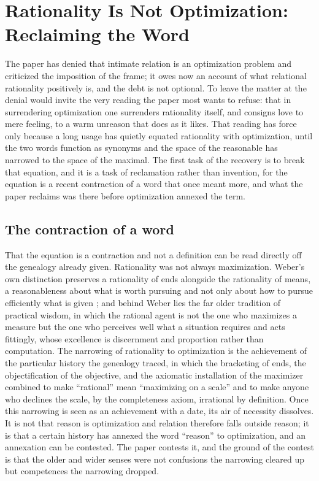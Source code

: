 \section{Rationality Is Not Optimization: Reclaiming the Word}
\label{p25:sec:reclaiming}

\noindent
The paper has denied that intimate relation is an optimization problem and criticized the imposition of the frame; it owes now an account of what relational rationality positively is, and the debt is not optional. To leave the matter at the denial would invite the very reading the paper most wants to refuse: that in surrendering optimization one surrenders rationality itself, and consigns love to mere feeling, to a warm unreason that does as it likes. That reading has force only because a long usage has quietly equated rationality with optimization, until the two words function as synonyms and the space of the reasonable has narrowed to the space of the maximal. The first task of the recovery is to break that equation, and it is a task of reclamation rather than invention, for the equation is a recent contraction of a word that once meant more, and what the paper reclaims was there before optimization annexed the term.

\subsection*{The contraction of a word}

That the equation is a contraction and not a definition can be read directly off the genealogy already given. Rationality was not always maximization. Weber's own distinction preserves a rationality of ends alongside the rationality of means, a reasonableness about what is worth pursuing and not only about how to pursue efficiently what is given \parencite{weber1978economy}; and behind Weber lies the far older tradition of practical wisdom, in which the rational agent is not the one who maximizes a measure but the one who perceives well what a situation requires and acts fittingly, whose excellence is discernment and proportion rather than computation. The narrowing of rationality to optimization is the achievement of the particular history the genealogy traced, in which the bracketing of ends, the objectification of the objective, and the axiomatic installation of the maximizer combined to make ``rational'' mean ``maximizing on a scale'' and to make anyone who declines the scale, by the completeness axiom, irrational by definition. Once this narrowing is seen as an achievement with a date, its air of necessity dissolves. It is not that reason is optimization and relation therefore falls outside reason; it is that a certain history has annexed the word ``reason'' to optimization, and an annexation can be contested. The paper contests it, and the ground of the contest is that the older and wider senses were not confusions the narrowing cleared up but competences the narrowing dropped.

